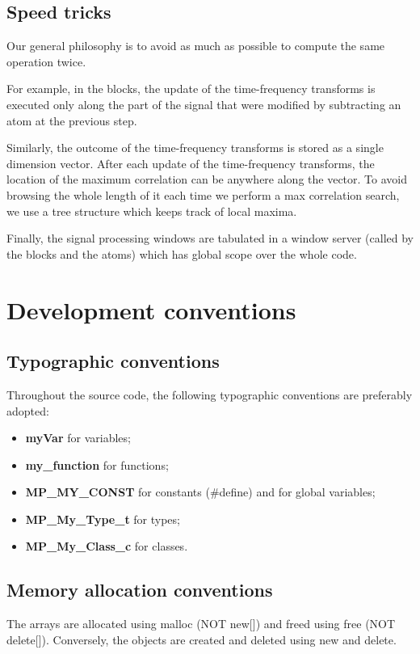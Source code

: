 \documentclass[11pt,a4paper]{article}
\begin{document}
\subsection{Speed tricks}
Our general philosophy is to avoid as much as possible to compute the same
operation twice.

For example, in the blocks, the update of the time-frequency transforms is
executed only along the part of the signal that were modified by subtracting an
atom at the previous step.

Similarly, the outcome of the time-frequency transforms is stored as a single
dimension vector. After each update of the time-frequency transforms, the
location of the maximum correlation can be anywhere along the vector. To avoid
browsing the whole length of it each time we perform a max correlation search,
we use a tree structure which keeps track of local maxima.

Finally, the signal processing windows are tabulated in a window server (called
by the blocks and the atoms) which has global scope over the whole code.


\clearpage
\section{Development conventions}

\subsection{Typographic conventions}
Throughout the source code, the following typographic conventions are
preferably adopted:
\begin{itemize}
\item {\bf myVar} for variables;
\item {\bf my\_function} for functions;
\item {\bf MP\_MY\_CONST} for constants (\#define) and for global variables;
\item {\bf MP\_My\_Type\_t} for types;
\item {\bf MP\_My\_Class\_c} for classes.
\end{itemize}

\subsection{Memory allocation conventions}
The arrays are allocated using malloc (NOT new[]) and freed using free (NOT
delete[]). Conversely, the objects are created and deleted using new and
delete.
\end{document}
